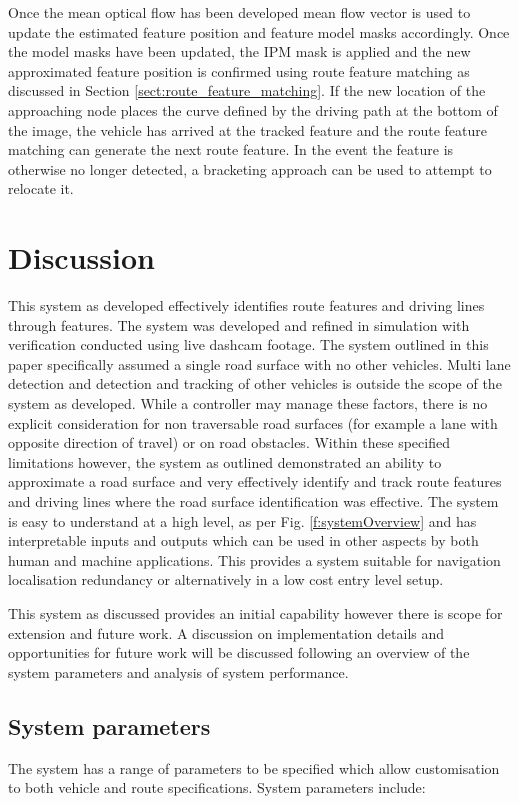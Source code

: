 \documentclass[]{aiaa-tc}%
\begin{document}
Once the mean optical flow has been developed mean flow vector is used to update the estimated feature position and feature model masks accordingly. Once the model masks have been updated, the IPM mask is applied and the new approximated feature position is confirmed using route feature matching as discussed in Section \ref{sect:route_feature_matching}. If the new location of the approaching node places the curve defined by the driving path at the bottom of the image, the vehicle has arrived at the tracked feature and the route feature matching can generate the next route feature. In the event the feature is otherwise no longer detected, a bracketing approach can be used to attempt to relocate it.

\section{Discussion} \label{s:discussion}

This system as developed effectively identifies route features and driving lines through features. The system was developed and refined in simulation with verification conducted using live dashcam footage. The system outlined in this paper specifically assumed a single road surface with no other vehicles. Multi lane detection and detection and tracking of other vehicles is outside the scope of the system as developed. While a controller may manage these factors, there is no explicit consideration for non traversable road surfaces (for example a lane with opposite direction of travel) or on road obstacles. Within these specified limitations however, the system as outlined demonstrated an ability to approximate a road surface and very effectively identify and track route features and driving lines where the road surface identification was effective. The system is easy to understand at a high level, as per Fig. \ref{f:systemOverview} and has interpretable inputs and outputs which can be used in other aspects by both human and machine applications. This provides a system suitable for navigation localisation redundancy or alternatively in a low cost entry level setup.

This system as discussed provides an initial capability however there is scope for extension and future work. A discussion on implementation details and opportunities for future work will be discussed following an overview of the system parameters and analysis of system performance.


\subsection{System parameters} The system has a range of parameters to be specified which allow customisation to both vehicle and route specifications. System parameters include: 
\end{document}
